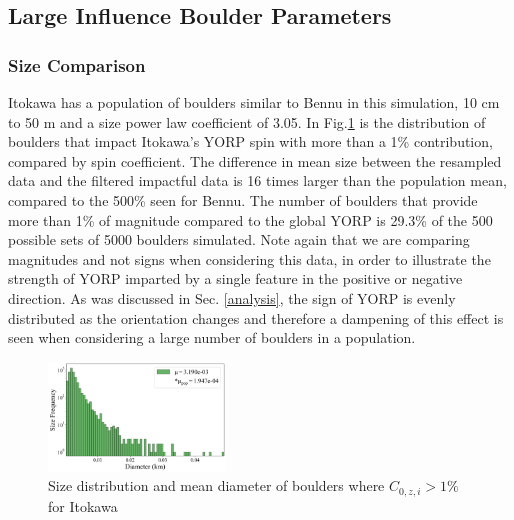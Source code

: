 \subsection{Large Influence Boulder Parameters}
\subsubsection{Size Comparison}
Itokawa has a population of boulders similar to Bennu in this simulation, 10 cm to 50 m and a size power law coefficient of 3.05. In Fig.\ref{fig:ito_percents} is the distribution of boulders that impact Itokawa's YORP spin with more than a 1\% contribution, compared by spin coefficient. The difference in mean size between the resampled data and the filtered impactful data is 16 times larger than the population mean, compared to the 500\% seen for Bennu. The number of boulders that provide more than 1\% of magnitude compared to the global YORP is 29.3\% of the 500 possible sets of 5000 boulders simulated. Note again that we are comparing magnitudes and not signs when considering this data, in order to illustrate the strength of YORP imparted by a single feature in the positive or negative direction. As was discussed in Sec. \ref{analysis}, the sign of YORP is evenly distributed as the orientation changes and therefore a dampening of this effect is seen when considering a large number of boulders in a population. 
\begin{figure}[H]
    \centering
    \includegraphics[width=0.42\textwidth]{fig/itokawa_impact_size_new.png}
    \caption{Size distribution and mean diameter of boulders where $C_{0,z,i} > 1\%$ for Itokawa}
    \label{fig:ito_percents}
\end{figure}
